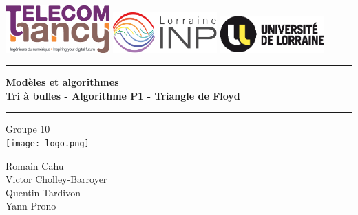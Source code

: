 \thispagestyle{empty}

{\color{primary}


\includegraphics[width=4.0cm]{img/school-logo.eps}
\hspace{9mm}
\includegraphics[width=4.0cm]{img/collegium-logo.eps}
\hspace{5mm}
\includegraphics[width=4.0cm]{img/university-logo.eps}

\vspace{0.5cm}

	\begin{center}


			{\color[rgb]{0.8,0.8,.8}\rule{\textwidth}{0.8pt}}
			\vspace{0.2cm}

			\baselineskip=3pt
			{\huge \bfseries{Modèles et algorithmes}}\\
			\vspace{0.5cm}
			{\Large \bfseries{Tri à bulles - Algorithme P1 - Triangle de Floyd}}
			\vspace{0.5cm}

		{\color[rgb]{0.8,0.8,.8}\rule{\textwidth}{0.8pt}}

		\vspace{1cm}

		\Large{Groupe 10}\\

		\vspace{1cm}
		\texttt{[image: logo.png]}


		\vspace{2cm}

		\Large{Romain Cahu}\\
		\Large{Victor Cholley-Barroyer}\\
		\Large{Quentin Tardivon}\\
		\Large{Yann Prono}\\
		\vspace{1cm}
		\large{\schoolYear}
	\end{center}

}
